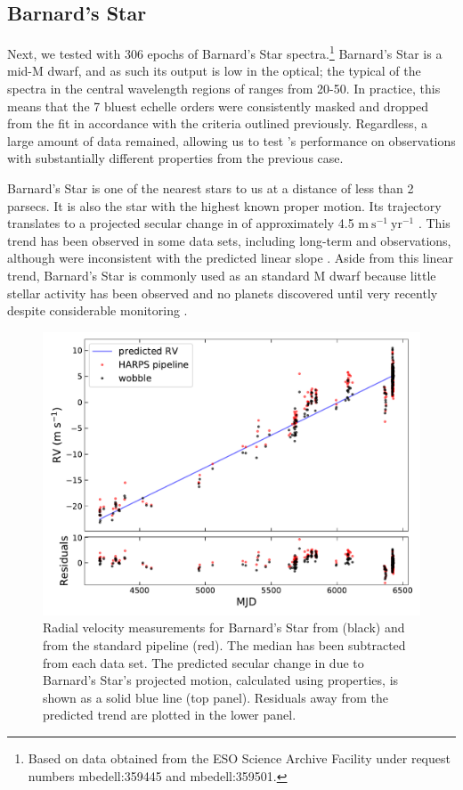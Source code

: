 \documentclass[modern]{aastex62}
\newcommand{\Mdwarf}{Barnard's Star\xspace} %
\begin{document}
\subsection{\Mdwarf}
\label{s:Mdwarf}

Next, we tested \wobble with 306 epochs of \Mdwarf spectra.\footnote{Based on data obtained from the ESO Science Archive Facility under request numbers mbedell:359445 and mbedell:359501.} 
\Mdwarf is a mid-M dwarf, and as such its output is low in the optical; the typical \SNR of the spectra in the central wavelength regions of \HARPS ranges from 20-50. 
In practice, this means that the 7 bluest echelle orders were consistently masked and dropped from the fit in accordance with the \SNR criteria outlined previously. 
Regardless, a large amount of data remained, allowing us to test \wobble's performance on observations with substantially different properties from the previous case.

\Mdwarf is one of the nearest stars to us at a distance of less than 2 parsecs. 
It is also the star with the highest known proper motion. 
Its trajectory translates to a projected secular change in \RV of approximately 4.5 $\mathrm{m}~\mathrm{s}^{-1}~\mathrm{yr}^{-1}$ \citep{Kurster2003}. 
This trend has been observed in some data sets, including long-term \HARPS and  observations, although  \RVs were inconsistent with the predicted linear slope \citep{Kurster2003, Bonfils2013, Choi2013, Montet2014}. 
Aside from this linear trend, \Mdwarf is commonly used as an \RV standard M dwarf because little stellar activity has been observed and no planets discovered until very recently despite considerable \RV monitoring \citep{Ribas2018}. 

\begin{figure}
\centering
\includegraphics[width=5in]{barnards_rvs}
\caption{Radial velocity measurements for \Mdwarf from \wobble (black) and from the standard \HARPS pipeline (red). The median \RV has been subtracted from each data set. The predicted secular change in \RV due to \Mdwarf's projected motion, calculated using \gaia properties, is shown as a solid blue line (top panel). Residuals away from the predicted trend are plotted in the lower panel. }
\label{fig:barnards_rvs}
\end{figure}
\end{document}
